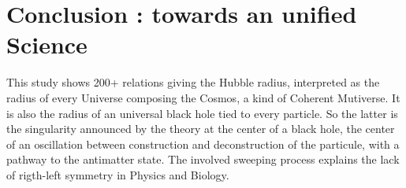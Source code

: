 \documentclass[a4paper,9pt]{article}
\begin{document}






    





\section{Conclusion : towards an unified Science}

This study shows 200+ relations giving the Hubble radius, interpreted as the radius of every Universe composing the Cosmos, a kind of Coherent Mutiverse. It is also the radius of an universal black hole tied to every particle. So the latter is the singularity announced by the theory at the center of a black hole, the center of an oscillation between construction and deconstruction of the particule, with a pathway to the antimatter state. The involved sweeping process explains the lack of rigth-left symmetry  in Physics and Biology.
\end{document}
